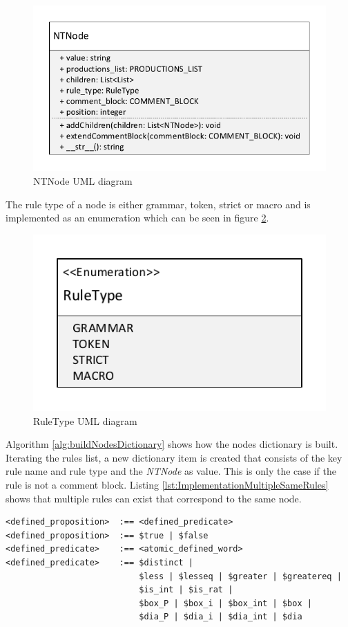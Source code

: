 \begin{figure}[H]
\centering
\includegraphics[width=1\textwidth]{images/uml_data_types_NTNode.pdf}
\caption{NTNode UML diagram}
\label{fig:ImplementationNTNodeUML}
\end{figure}

The rule type of a node is either grammar, token, strict or macro and is implemented as an enumeration which can be seen in figure \ref{fig:ImplementationRuleTypeUML}. 

\begin{figure}[H]
\centering
\includegraphics[width=.7\textwidth]{images/uml_data_types_rule_type.pdf}
\caption{RuleType UML diagram}
\label{fig:ImplementationRuleTypeUML}
\end{figure}

Algorithm \ref{alg:buildNodesDictionary} shows how the nodes dictionary is built. Iterating the rules list, a new dictionary item is created that consists of the key rule name and rule type and the \textit{NTNode} as value. This is only the case if the rule is not a comment block. 
Listing \ref{lst:ImplementationMultipleSameRules} shows that multiple rules can exist that correspond to the same node.\\

\begin{lstlisting}[language=None, basicstyle=\scriptsize	,caption= Multiple rules with the same left-hand side of the rule,label= lst:ImplementationMultipleSameRules]
<defined_proposition>  :== <defined_predicate>
<defined_proposition>  :== $true | $false
<defined_predicate>    :== <atomic_defined_word>
<defined_predicate>    :== $distinct |
                           $less | $lesseq | $greater | $greatereq |
                           $is_int | $is_rat |
                           $box_P | $box_i | $box_int | $box |
                           $dia_P | $dia_i | $dia_int | $dia
\end{lstlisting}

